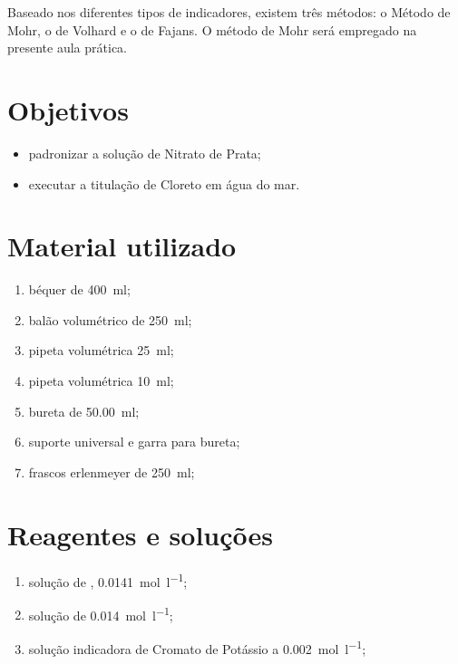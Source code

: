 \documentclass[a4paper,12pt]{article}
\begin{document}
Baseado nos diferentes tipos de indicadores, existem três métodos: o Método de Mohr, o de Volhard e o de Fajans. O método de Mohr será empregado na presente aula prática.


\section{Objetivos}

\begin{itemize}
  \item padronizar a solução de Nitrato de Prata;
  \item executar a titulação de Cloreto em água do mar.

\end{itemize}

\section{Material utilizado}

\begin{enumerate}[label=\alph*.]
  \item béquer de \qty{400}{\milli\litre};
  \item balão volumétrico de \qty{250}{\milli\litre};
  \item pipeta volumétrica \qty{25}{\milli\litre};
  \item pipeta volumétrica \qty{10}{\milli\litre};
  \item bureta de \qty{50.00}{\milli\litre};
  \item suporte universal e garra para bureta;
  \item frascos erlenmeyer de \qty{250}{\milli\litre};
 \end{enumerate}

\section{Reagentes e soluções}

\begin{enumerate}[label=\alph*.]
  \item solução de , \qty{0.0141}{\mole\per\litre};
  \item solução de   \qty{0.014}{\mole\per\litre};
  \item solução indicadora de Cromato de Potássio a \qty{0.002}{\mole\per\litre};
  \end{enumerate}
\end{document}

